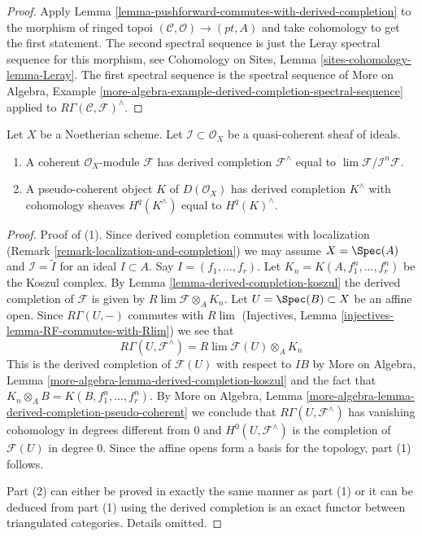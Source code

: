 \begin{proof}
Apply Lemma \ref{lemma-pushforward-commutes-with-derived-completion}
to the morphism of ringed topoi $(\mathcal{C}, \mathcal{O}) \to (pt, A)$
and take cohomology to get the first statement. The second spectral sequence
is just the Leray spectral sequence for this morphism, see
Cohomology on Sites, Lemma \ref{sites-cohomology-lemma-Leray}.
The first spectral sequence is the spectral sequence of
More on Algebra, Example
\ref{more-algebra-example-derived-completion-spectral-sequence}
applied to $R\Gamma(\mathcal{C}, \mathcal{F})^\wedge$.
\end{proof}

\begin{lemma}
\label{lemma-derived-completion-pseudo-coherent}
Let $X$ be a Noetherian scheme. Let $\mathcal{I} \subset \mathcal{O}_X$
be a quasi-coherent sheaf of ideals.
\begin{enumerate}
\item A coherent $\mathcal{O}_X$-module $\mathcal{F}$ has derived
completion $\mathcal{F}^\wedge$ equal to
$\lim \mathcal{F}/\mathcal{I}^n\mathcal{F}$.
\item A pseudo-coherent object $K$ of $D(\mathcal{O}_X)$ has
derived completion $K^\wedge$ with cohomology sheaves $H^q(K^\wedge)$
equal to $H^q(K)^\wedge$.
\end{enumerate}
\end{lemma}

\begin{proof}
Proof of (1). Since derived completion commutes with localization
(Remark \ref{remark-localization-and-completion})
we may assume $X = \Spec(A)$ and $\mathcal{I} = \widetilde{I}$ for an
ideal $I \subset A$. Say $I = (f_1, \ldots, f_r)$. Let
$K_n = K(A, f_1^n, \ldots, f_r^n)$ be the Koszul complex.
By Lemma \ref{lemma-derived-completion-koszul} the derived completion
of $\mathcal{F}$ is given by $R\lim \mathcal{F} \otimes_A K_n$.
Let $U = \Spec(B) \subset X$ be an affine open. Since $R\Gamma(U, -)$
commutes with $R\lim$
(Injectives, Lemma \ref{injectives-lemma-RF-commutes-with-Rlim})
we see that
$$
R\Gamma(U, \mathcal{F}^\wedge) =
R\lim \mathcal{F}(U) \otimes_A K_n
$$
This is the derived completion of $\mathcal{F}(U)$ with respect to $IB$
by More on Algebra, Lemma \ref{more-algebra-lemma-derived-completion-koszul}
and the fact that $K_n \otimes_A B = K(B, f_1^n, \ldots, f_r^n)$.
By More on Algebra, Lemma
\ref{more-algebra-lemma-derived-completion-pseudo-coherent}
we conclude that $R\Gamma(U, \mathcal{F}^\wedge)$ has vanishing
cohomology in degrees different from $0$ and $H^0(U, \mathcal{F}^\wedge)$
is the completion of $\mathcal{F}(U)$ in degree $0$. Since the affine
opens form a basis for the topology, part (1) follows.

\medskip\noindent
Part (2) can either be proved in exactly the same manner as part (1)
or it can be deduced from part (1) using the derived completion
is an exact functor between triangulated categories. Details omitted.
\end{proof}

